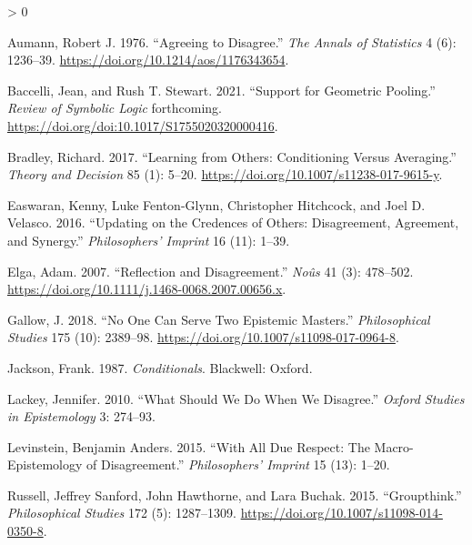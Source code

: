 \documentclass[
  12pt,
]{article}
\newlength{\cslhangindent}
\newenvironment{CSLReferences}[2] %
 {%
  \setlength{\parindent}{0pt}
  \ifodd #1 \everypar{\setlength{\hangindent}{\cslhangindent}}\ignorespaces\fi
  \ifnum #2 > 0
  \setlength{\parskip}{#2\baselineskip}
  \fi
 }%
 {}
\begin{document}
\hypertarget{refs}{}
\begin{CSLReferences}{1}{0}
\leavevmode\hypertarget{ref-Aumann1976}{}%
Aumann, Robert J. 1976. {``Agreeing to Disagree.''} \emph{The Annals of
Statistics} 4 (6): 1236--39.
\url{https://doi.org/10.1214/aos/1176343654}.

\leavevmode\hypertarget{ref-BaccelliStewart2021}{}%
Baccelli, Jean, and Rush T. Stewart. 2021. {``Support for Geometric
Pooling.''} \emph{Review of Symbolic Logic} forthcoming.
\url{https://doi.org/doi:10.1017/S1755020320000416}.

\leavevmode\hypertarget{ref-Bradley2017}{}%
Bradley, Richard. 2017. {``Learning from Others: Conditioning Versus
Averaging.''} \emph{Theory and Decision} 85 (1): 5--20.
\url{https://doi.org/10.1007/s11238-017-9615-y}.

\leavevmode\hypertarget{ref-EaswaranEtAl2016}{}%
Easwaran, Kenny, Luke Fenton-Glynn, Christopher Hitchcock, and Joel D.
Velasco. 2016. {``Updating on the Credences of Others: Disagreement,
Agreement, and Synergy.''} \emph{Philosophers' Imprint} 16 (11): 1--39.

\leavevmode\hypertarget{ref-Elga2007}{}%
Elga, Adam. 2007. {``Reflection and Disagreement.''} \emph{No{û}s} 41
(3): 478--502. \url{https://doi.org/10.1111/j.1468-0068.2007.00656.x}.

\leavevmode\hypertarget{ref-Gallow2018}{}%
Gallow, J. 2018. {``No One Can Serve Two Epistemic Masters.''}
\emph{Philosophical Studies} 175 (10): 2389--98.
\url{https://doi.org/10.1007/s11098-017-0964-8}.

\leavevmode\hypertarget{ref-Jackson1987}{}%
Jackson, Frank. 1987. \emph{Conditionals}. Blackwell: Oxford.

\leavevmode\hypertarget{ref-Lackey2010-LACWSW}{}%
Lackey, Jennifer. 2010. {``What Should We Do When We Disagree.''}
\emph{Oxford Studies in Epistemology} 3: 274--93.

\leavevmode\hypertarget{ref-Levinstein2015}{}%
Levinstein, Benjamin Anders. 2015. {``With All Due Respect: The
Macro-Epistemology of Disagreement.''} \emph{Philosophers' Imprint} 15
(13): 1--20.

\leavevmode\hypertarget{ref-RussellEtAl2015}{}%
Russell, Jeffrey Sanford, John Hawthorne, and Lara Buchak. 2015.
{``Groupthink.''} \emph{Philosophical Studies} 172 (5): 1287--1309.
\url{https://doi.org/10.1007/s11098-014-0350-8}.

\end{CSLReferences}
\end{document}
